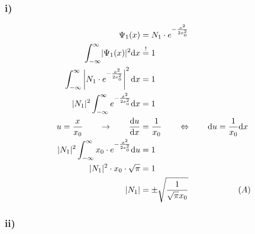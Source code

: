 \subsubsection{i)}

    \begin{align*}
        \Psi_1(x) &= N_1 \cdot e^{- \frac{x^2}{2x_0^2}}\\
        \int_{-\infty}^{\infty} \lvert\Psi_1 (x)\rvert^2 \mathrm{d}x &\stackrel{!}{=} 1\\
        \int_{-\infty}^{\infty} \left| N_1 \cdot e^{-\frac{x^2}{2x_0^2}} \right| ^2 \mathrm{d}x &= 1 \nonumber\\
        \lvert N_1\rvert^2 \int_{-\infty}^{\infty} e^{-\frac{x^2}{2x_0^2}} \mathrm{d}x &= 1 \nonumber\\
        u = \frac{x}{x_0} \qquad \rightarrow \qquad \frac{\mathrm{d}u}{\mathrm{d}x} &= \frac{1}{x_0} 
        \qquad \Leftrightarrow \qquad \mathrm{d}u = \frac{1}{x_0} \mathrm{d}x \nonumber\\
        \lvert N_1\rvert^2 \int_{-\infty}^{\infty} x_0 \cdot e^{-\frac{x^2}{2x_0^2}} \mathrm{d}u &= 1 \nonumber\\
        \lvert N_1\rvert^2 \cdot x_0 \cdot \sqrt{\pi} &= 1 \nonumber\\
        \lvert N_1\rvert &= \pm \sqrt{\frac{1}{\sqrt{\pi}x_0}} \qquad \qquad \qquad (A)
    \end{align*}

\subsubsection{ii)}

